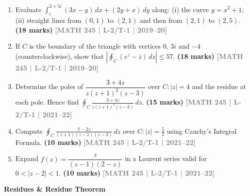 \documentclass[12pt,a4paper]{article}
\newcommand{\yr}[1]{\hfill\textcolor{gray}{\small\textbf{[#1]}}}
\newcommand{\mk}[1]{\textcolor{orange!70!black}{\small\textbf{(#1 marks)}}}
\newcommand{\subtopic}[2]{%
  \vspace{10pt}
  \noindent\begin{tcolorbox}[colback=#1!8,colframe=#1,boxrule=0.6pt,arc=4pt,
    left=6pt,right=6pt,top=4pt,bottom=4pt]
    \small\bfseries\textcolor{#1}{#2}
  \end{tcolorbox}
  \vspace{2pt}
}
\begin{document}
\begin{enumerate}
\item Evaluate $\displaystyle\int_{i}^{2+5i}(3x-y)\,dx+(2y+x)\,dy$ along: (i) the curve $y=x^{2}+1$; (ii) straight lines from $(0,1)$ to $(2,1)$ and then from $(2,1)$ to $(2,5)$.
\mk{18} \yr{MATH 245 | L-2/T-1 | 2019--20}

\item If $C$ is the boundary of the triangle with vertices $0$, $3i$ and $-4$ (counterclockwise), show that $\left|\displaystyle\oint_{C}(e^{z}-\bar{z})\,dz\right|\le 57$.
\mk{18} \yr{MATH 245 | L-2/T-1 | 2019--20}

\item Determine the poles of $\dfrac{3+4z}{z(z+1)^{2}(z-3)}$ over $C:|z|=4$ and the residue at each pole. Hence find $\displaystyle\oint_{C}\frac{3+4z}{z(z+1)^{2}(z-3)}\,dz$.
\mk{15} \yr{MATH 245 | L-2/T-1 | 2021--22}

\item Compute $\displaystyle\oint_{C}\frac{7-2z}{(z+1)(z-1)(z-3)}\,dz$ over $C:|z|=\tfrac{5}{2}$ using Cauchy's Integral Formula.
\mk{10} \yr{MATH 245 | L-2/T-1 | 2021--22}

\item Expand $f(z)=\dfrac{z}{(z-1)(2-z)}$ in a Laurent series valid for $0<|z-2|<1$.
\mk{10} \yr{MATH 245 | L-2/T-1 | 2021--22}

\end{enumerate}

\subtopic{cE}{Residues \& Residue Theorem}
\label{sub:s5-residue}
\end{document}
